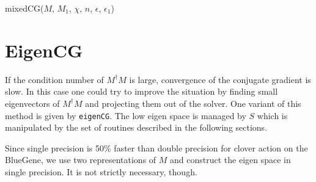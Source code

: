 \documentclass[oneside,openright]{report}
\begin{document}
\begin{function}
\DontPrintSemicolon
{}
\caption{mixedCG($M$, $M_1$, $\chi$, $n$, $\epsilon$, $\epsilon_1$)}
\end{function}
\section{EigenCG}
If the condition number of $M^\dagger M$ is large, convergence of the conjugate gradient is slow. In this case one could try to improve the situation by finding small eigenvectors of $M^\dagger M$ and projecting them out of the solver. One variant of this method is given by \texttt{eigenCG}. The low eigen space is managed by $S$ which is manipulated by the set of routines described in the following sections.

Since single precision is 50\% faster than double precision for clover action on the BlueGene,
we use two representations of $M$ and construct the eigen space in single precision. 
It is not strictly necessary, though.
\end{document}
